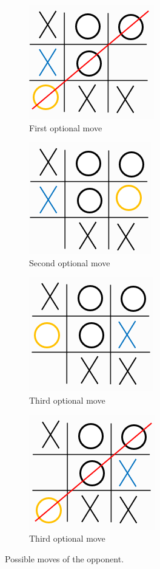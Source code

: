 \documentclass[conference]{IEEEtran}
\begin{document}
\begin{figure}[H]
\centering
\begin{subfigure}{.24\textwidth}
    \centering
    \includegraphics[scale=0.45]{img/chess3_1.png}
    \caption{First optional move}
    \label{tic3_1}
\end{subfigure}
\begin{subfigure}{.24\textwidth}
    \centering
    \includegraphics[scale=0.45]{img/chess3_2.png} 
    \caption{Second optional move}
    \label{tic3_2}
\end{subfigure}
\begin{subfigure}{.24\textwidth}
    \centering
    \includegraphics[scale=0.45]{img/chess3_3.png}
    \caption{Third optional move}
    \label{tic3_3}
\end{subfigure}
\begin{subfigure}{.24\textwidth}
    \centering
    \includegraphics[scale=0.45]{img/chess3_4.png}
    \caption{Third optional move}
    \label{tic3_4}
\end{subfigure}
\caption{Possible moves of the opponent.}
\label{tic_3}
\end{figure}
\end{document}
